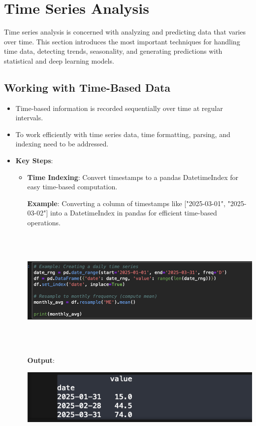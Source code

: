 \documentclass{article}
\begin{document}
\section{Time Series Analysis}
Time series analysis is concerned with analyzing and predicting data that varies over time. This section introduces the most important techniques for handling time data, detecting trends, seasonality, and generating predictions with statistical and deep learning models.
\subsection{Working with Time-Based Data}
\begin{itemize}
\item Time-based information is recorded sequentially over time at regular intervals.
\item To work efficiently with time series data, time formatting, parsing, and indexing need to be addressed.
\item \textbf{Key Steps}:
\begin{itemize}
\item \textbf{Time Indexing}: Convert timestamps to a pandas DatetimeIndex for easy time-based computation.

\textbf{Example}: Converting a column of timestamps like ["2025-03-01", "2025-03-02"] into a DatetimeIndex in pandas for efficient time-based operations.

\includegraphics[width=14cm,height=6cm]{Resampling.png}

\textbf{Output}:

\includegraphics[width=14cm,height=2.5
cm]{Resampling_Output.png}


\end{itemize}
\end{itemize}
\end{document}
